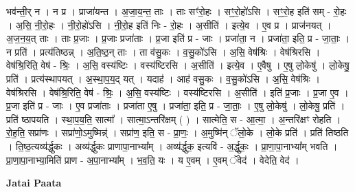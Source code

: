 \documentclass[17pt]{extarticle}
\begin{document}
भव॑न्ती॒र् न । न प्र । प्राजा॑यन्त । अ॒जा॒य॒न्त॒ ताः । ताः सꣳ॑रो॒हः । सꣳ॒॒रो॒हो॑ऽसि । सꣳ॒॒रो॒ह इति॑ सम् - रो॒हः । अ॒सि॒ नी॒रो॒हः । नी॒रो॒हो॑ऽसि । नी॒रो॒ह इति॑ निः - रो॒हः । अ॒सीति॑ । इत्ये॒व । ए॒व प्र । प्राज॑नयत् । अ॒ज॒न॒य॒त् ताः । ताः प्र॒जाः । प्र॒जाः प्रजा॑ताः । प्र॒जा इति॑ प्र - जाः । प्रजा॑ता॒ न । प्रजा॑ता॒ इति॒ प्र - जा॒ताः॒ । न प्रति॑ । प्रत्य॑तिष्ठन्न् । अ॒ति॒ष्ठ॒न् ताः । ता व॑सु॒कः । व॒सु॒को॑ऽसि । अ॒सि॒ वेष॑श्रिः । वेष॑श्रिरसि । वेष॑श्रि॒रिति॒ वेष॑ - श्रिः॒ । अ॒सि॒ वस्य॑ष्टिः । वस्य॑ष्टिरसि । अ॒सीति॑ । इत्ये॒व । ए॒वैषु । ए॒षु लो॒केषु॑ । लो॒केषु॒ प्रति॑ । प्रत्य॑स्थापयत् । अ॒स्था॒प॒य॒द् यत् । यदाह॑ । आह॑ वसु॒कः । व॒सु॒को॑ऽसि । अ॒सि॒ वेष॑श्रिः । वेष॑श्रिरसि । वेष॑श्रि॒रिति॒ वेष॑ - श्रिः॒ । अ॒सि॒ वस्य॑ष्टिः । वस्य॑ष्टिरसि । अ॒सीति॑ । इति॑ प्र॒जाः । प्र॒जा ए॒व । प्र॒जा इति॑ प्र - जाः । ए॒व प्रजा॑ताः । प्रजा॑ता ए॒षु । प्रजा॑ता॒ इति॒ प्र - जा॒ताः॒ । ए॒षु लो॒केषु॑ । लो॒केषु॒ प्रति॑ । प्रति॑ ष्ठापयति । स्था॒प॒य॒ति॒ सात्मा᳚ । सात्मा॒ऽन्तरि॑क्षम् ( ) । सात्मेति॒ स - आ॒त्मा॒ । अ॒न्तरि॑क्षꣳ रोहति । रो॒ह॒ति॒ सप्रा॑णः । सप्रा॑णो॒ऽमुष्मिन्न्॑ । सप्रा॑ण॒ इति॒ स - प्रा॒णः॒ । अ॒मुष्मि॑न् ॅलो॒के । लो॒के प्रति॑ । प्रति॑ तिष्ठति । ति॒ष्ठ॒त्यव्य॑र्द्धुकः । अव्य॑र्द्धुकः प्राणापा॒नाभ्या᳚म् । अव्य॑र्द्धुक॒ इत्यवि॑ - अ॒र्द्धु॒कः॒ । 
प्रा॒णा॒पा॒नाभ्या᳚म् भवति । प्रा॒णा॒पा॒नाभ्या॒मिति॑ प्राण - अ॒पा॒नाभ्या᳚म् । भ॒व॒ति॒ यः । य ए॒वम् । ए॒वम् ॅवेद॑ । वेदेति॒ वेद॑ । \newline

\textbf{Jatai Paata} \newline
\end{document}
